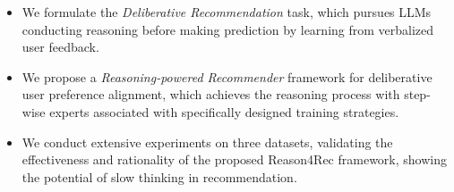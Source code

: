 

%
%
%
%
%
\begin{itemize}[leftmargin=*]
\item We formulate the \textit{Deliberative Recommendation} task, which pursues LLMs conducting reasoning before making prediction by learning from verbalized user feedback. 

\item We propose a \textit{Reasoning-powered Recommender} framework for deliberative user preference alignment, which achieves the reasoning process with step-wise experts associated with specifically designed training strategies. 

\item We conduct extensive experiments on three datasets, validating the effectiveness and rationality of the proposed Reason4Rec framework, showing the potential of slow thinking in recommendation.

\end{itemize}





